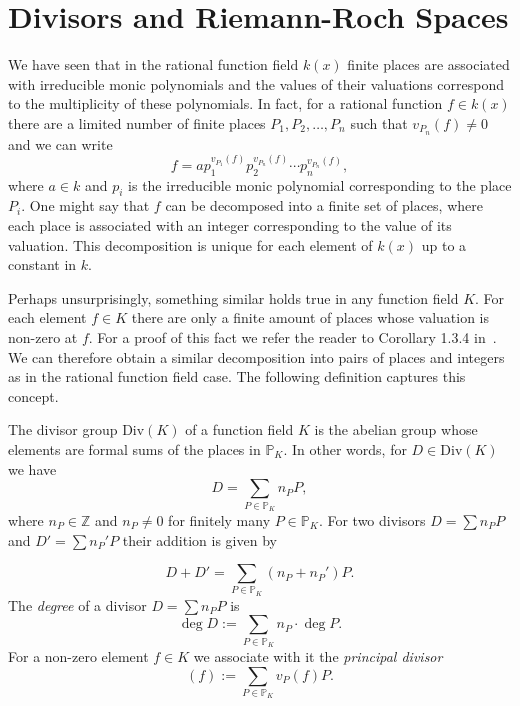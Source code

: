 \section{Divisors and Riemann-Roch Spaces}%
\label{sec:divisors-and-riemann-roch-spaces}

We have seen that in the rational function field \(k(x)\) finite places are associated with irreducible monic polynomials and the values of their valuations correspond to the multiplicity of these polynomials. In fact, for a rational function \(f \in k(x)\) there are a limited number of finite places \(P_{1}, P_{2}, \dots, P_{n}\) such that \(v_{P_{n}}(f) \neq 0\) and we can write
\[f = a p_{1}^{v_{P_{1}}(f)} p_{2}^{v_{P_{n}}(f)} \cdots p_{n}^{v_{P_{n}}(f)},\]
where \(a \in k\) and \(p_{i}\) is the irreducible monic polynomial corresponding to the place \(P_{i}\). One might say that \(f\) can be decomposed into a finite set of places, where each place is associated with an integer corresponding to the value of its valuation. This decomposition is unique for each element of \(k(x)\) up to a constant in \(k\).

Perhaps unsurprisingly, something similar holds true in any function field \(K\). For each element \(f \in K\) there are only a finite amount of places whose valuation is non-zero at \(f\). For a proof of this fact we refer the reader to Corollary 1.3.4 in~\cite{stichtenoth-2009-algebraic-function-fields}. We can therefore obtain a similar decomposition into pairs of places and integers as in the rational function field case. The following definition captures this concept.

\begin{definition}%
  \label{def:divisor}
  The divisor group \(\mathrm{Div}(K)\) of a function field \(K\) is the abelian group whose elements are formal sums of the places in \(\mathbb{P}_{K}\). In other words, for \(D \in \mathrm{Div}(K)\) we have
  \[D = \sum_{P \in \mathbb{P}_{K}} n_{P} P,\]
  where \(n_{P} \in \mathbb{Z}\) and \(n_{P} \neq 0\) for finitely many \(P \in \mathbb{P}_{K}\). For two divisors \({D = \sum n_{P}P}\) and \({D' = \sum n_{P}'P}\) their addition is given by

  \[D + D' = \sum_{P \in \mathbb{P}_{K}} \left( n_{P} + n_{P}' \right) P.\]
  The \textit{degree} of a divisor \({D = \sum n_{P}P}\) is
  \[\deg{D} := \sum_{P \in \mathbb{P}_{K}} n_{P} \cdot \deg{P}.\]
  For a non-zero element \(f \in K\) we associate with it the \textit{principal divisor}
  \[(f) := \sum_{P \in \mathbb{P}_{K}} v_{P}(f) P.\]
\end{definition}

